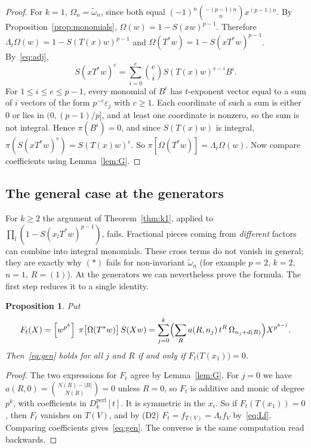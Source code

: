 \documentclass[11pt]{amsart}
\newtheorem{proposition}[theorem]{Proposition}
\theoremstyle{definition}
\theoremstyle{remark}
\newcommand{\Dperf}{D_k^{\mathrm{perf}}}
\newcommand{\wt}{\widetilde{\omega}}
\newcommand{\coef}[1]{\left[#1\right]}
\begin{document}
\begin{proof}
For $k=1$, $\Omega_n=\wt_n$, since both equal
$(-1)^n\binom{-(p-1)n}{n}x^{(p-1)n}$.  By
Proposition~\ref{prop:monomials}, $\Omega(w)=1-S(xw)^{p-1}$.  Therefore
$\Lambda_t\Omega(w)=1-S(T(x)w)^{p-1}$ and $\Omega(T^*w)=1-S(xT^*w)^{p-1}$.
By~\eqref{eq:adj},
\[
  S(xT^*w)^e=\sum_{i=0}^e\binom ei S(T(x)w)^{e-i}B^i .
\]
For $1\le i\le e\le p-1$, every monomial of $B^i$ has $t$-exponent vector
equal to a sum of $i$ vectors of the form $p^{-c}\varepsilon_j$ with $c\ge1$.
Each coordinate of such a sum is either $0$ or lies in $(0,(p-1)/p]$, and at
least one coordinate is nonzero, so the sum is not integral.  Hence
$\pi(B^i)=0$, and since $S(T(x)w)$ is integral,
$\pi(S(xT^*w)^e)=S(T(x)w)^e$.  So
$\pi[\Omega(T^*w)]=\Lambda_t\Omega(w)$.  Now compare coefficients using
Lemma~\ref{lem:G}.
\end{proof}

\subsection{The general case at the generators}
For $k\ge2$ the argument of Theorem~\ref{thm:k1}, applied to
$\prod_l(1-S(x_lT^*w)^{p-1})$, fails.  Fractional pieces coming from
\emph{different} factors can combine into integral monomials.  These cross
terms do not vanish in general; they are exactly why $(\ast)$ fails for
non-invariant $\wt_n$ (for example $p=2$, $k=2$, $n=1$, $R=(1)$).  At the
generators we can nevertheless prove the formula.  The first step reduces it to
a single identity.

\begin{proposition}\label{prop:reduction}
Put
\[
  F_t(X)=\coef{w^{p^k}}\;\pi\bigl[\Omega(T^*w)\bigr]\,S(Xw)
  =\sum_{j=0}^k\Bigl(\sum_R a(R,n_j)\,t^R\,\Omega_{n_j+d(R)}\Bigr)X^{p^{k-j}} .
\]
Then~\eqref{eq:gen} holds for all $j$ and $R$ if and only if
$F_t\bigl(T(x_1)\bigr)=0$.
\end{proposition}

\begin{proof}
The two expressions for $F_t$ agree by Lemma~\ref{lem:G}.  For $j=0$ we have
$a(R,0)=\binom{N(R)-|R|}{N(R)}=0$ unless $R=0$, so $F_t$ is additive and monic
of degree $p^k$, with coefficients in $\Dperf[t]$.  It is symmetric in the
$x_i$.  So if $F_t(T(x_1))=0$, then $F_t$ vanishes on $T(V)$, and by (D2)
$F_t=f_{T(V)}=\Lambda_tf_V$ by~\eqref{eq:Lf}.  Comparing coefficients
gives~\eqref{eq:gen}.  The converse is the same computation read backwards.
\end{proof}
\end{document}
